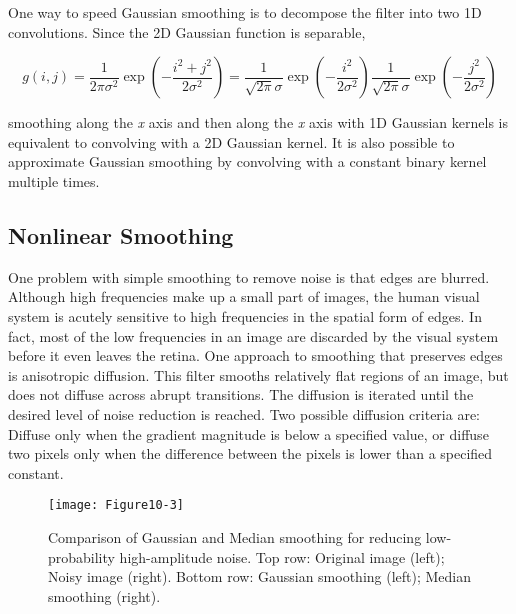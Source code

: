 One way to speed Gaussian smoothing is to decompose the filter into two 1D convolutions. Since the 2D Gaussian function is separable,

\begin{equation}\label{eq:10.1}
g(i, j) = \dfrac{1}{2\pi \sigma^2} \exp\left(-\dfrac{i^2 + j^2}{2\sigma^2} \right)
        = \dfrac{1}{\sqrt{2\pi}\sigma} \exp\left(-\dfrac{i^2}{2\sigma^2} \right)
          \dfrac{1}{\sqrt{2\pi}\sigma} \exp\left(-\dfrac{j^2}{2\sigma^2} \right)
\end{equation}

\noindent smoothing along the \emph{x} axis and then along the \emph{x} axis with 1D Gaussian kernels is equivalent to convolving with a 2D Gaussian kernel. It is also possible to approximate Gaussian smoothing by convolving with a constant binary kernel multiple times.

\subsection{Nonlinear Smoothing}

One problem with simple smoothing to remove noise is that edges are blurred. Although high frequencies make up a small part of images, the human visual system is acutely sensitive to high frequencies in the spatial form of edges. In fact, most of the low frequencies in an image are discarded by the visual system before it even leaves the retina. One approach to smoothing that preserves edges is anisotropic diffusion. This filter smooths relatively flat regions of an image, but does not diffuse across abrupt transitions. The diffusion is iterated until the desired level of noise reduction is reached. Two possible diffusion criteria are: Diffuse only when the gradient magnitude is below a specified value, or diffuse two pixels only when the difference between the pixels is lower than a specified constant.

\begin{figure}[!htb]
	\centering
	\texttt{[image: Figure10-3]}
	\caption{Comparison of Gaussian and Median smoothing for reducing low-probability high-amplitude noise. Top row: Original image (left); Noisy image (right). Bottom row: Gaussian smoothing (left); Median smoothing (right).}
	\label{fig:Figure10-3}
\end{figure}

